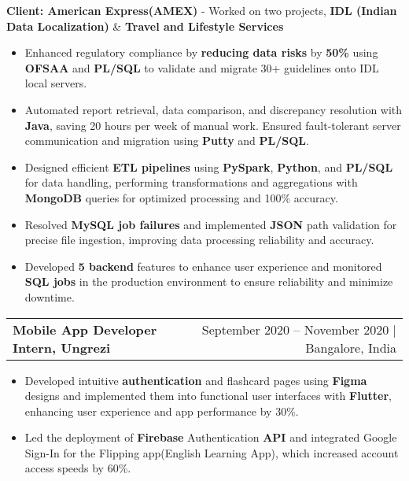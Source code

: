 \documentclass[10pt, legalpaper]{article}
\newenvironment{highlights}{
    \begin{itemize}[
        topsep=0.10 cm,
        parsep=0.10 cm,
        partopsep=0pt,
        itemsep=0pt,
        leftmargin=0 cm + 10pt
    ]
}{
    \end{itemize}
}
\newenvironment{onecolentry}{
    \par\noindent
}{
    \par
}
\begin{document}
\begin{onecolentry}

\textbf{Client: American Express(AMEX)} - Worked on two projects, \textbf{IDL (Indian Data Localization)} \& \textbf{Travel and Lifestyle Services}
\vspace{-1mm}
    \begin{highlights}
        \item Enhanced regulatory compliance by \textbf{reducing data risks} by\textbf{ 50\%} using \textbf{OFSAA} and \textbf{PL/SQL} to validate and migrate 30+ guidelines onto IDL local servers.
        \item Automated report retrieval, data comparison, and discrepancy resolution with \textbf{Java}, saving 20 hours per week of manual work. Ensured fault-tolerant server communication and migration using \textbf{Putty} and \textbf{PL/SQL}.
        \item Designed efficient \textbf{ETL pipelines} using \textbf{PySpark}, \textbf{Python}, and \textbf{PL/SQL} for data handling, performing transformations and aggregations with \textbf{MongoDB} queries for optimized processing and 100\% accuracy.
        \item Resolved \textbf{MySQL job failures} and implemented\textbf{ JSON} path validation for precise file ingestion, improving data processing reliability and accuracy.
        \item Developed\textbf{ 5 backend} features to enhance user experience and monitored \textbf{SQL jobs} in the production environment to ensure reliability and minimize downtime.
    \end{highlights}
\end{onecolentry}

\vspace{0.0 cm}

\begin{tabularx}{\textwidth}{@{}Xr@{}}
    \textbf{Mobile App Developer Intern, Ungrezi} & September 2020 – November 2020 | Bangalore, India \\
\end{tabularx}
\vspace{-5mm}
\begin{onecolentry}
    \begin{highlights}
        \item Developed intuitive \textbf{authentication} and flashcard pages using \textbf{Figma} designs and implemented them into functional user interfaces with \textbf{Flutter}, enhancing user experience and app performance by 30\%.
        \item Led the deployment of \textbf{Firebase} Authentication \textbf{API} and integrated Google Sign-In for the Flipping app(English Learning App), which increased account access speeds by 60\%.
    \end{highlights}
\end{onecolentry}
\end{document}
